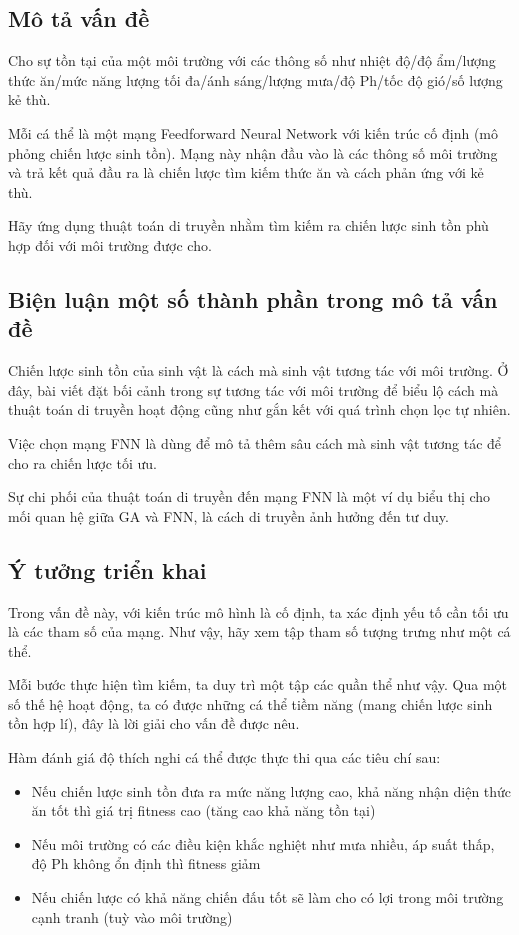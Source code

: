 \subsection{Mô tả vấn đề}
	Cho sự tồn tại của một môi trường với các thông số như nhiệt độ/độ ẩm/lượng thức ăn/mức năng lượng tối đa/ánh sáng/lượng mưa/độ Ph/tốc độ gió/số lượng kẻ thù.
	 
	Mỗi cá thể là một mạng Feedforward Neural Network với kiến trúc cố định (mô phỏng chiến lược sinh tồn). Mạng này nhận đầu vào là các thông số môi trường và trả kết quả đầu ra là chiến lược tìm kiếm thức ăn và cách phản ứng với kẻ thù.
	
	Hãy ứng dụng thuật toán di truyền nhằm tìm kiếm ra chiến lược sinh tồn phù hợp đối với môi trường được cho.

\subsection{Biện luận một số thành phần trong mô tả vấn đề}
	Chiến lược sinh tồn của sinh vật là cách mà sinh vật tương tác với môi trường. Ở đây, bài viết đặt bối cảnh trong sự tương tác với môi trường để biểu lộ cách mà thuật toán di truyền hoạt động cũng như gắn kết với quá trình chọn lọc tự nhiên.
	
	Việc chọn mạng FNN là dùng để mô tả thêm sâu cách mà sinh vật tương tác để cho ra chiến lược tối ưu.
	
	Sự chi phối của thuật toán di truyền đến mạng FNN là một ví dụ biểu thị cho mối quan hệ giữa GA và FNN, là cách di truyền ảnh hưởng đến tư duy.
	
\subsection{Ý tưởng triển khai}
	Trong vấn đề này, với kiến trúc mô hình là cố định, ta xác định yếu tố cần tối ưu là các tham số của mạng. Như vậy, hãy xem tập tham số tượng trưng như một cá thể. 
	
	Mỗi bước thực hiện tìm kiếm, ta duy trì một tập các quần thể như vậy. Qua một số thế hệ hoạt động, ta có được những cá thể tiềm năng (mang chiến lược sinh tồn hợp lí), đây là lời giải cho vấn đề được nêu.
	
	Hàm đánh giá độ thích nghi cá thể được thực thi qua các tiêu chí sau:
	\begin{itemize}
		\item Nếu chiến lược sinh tồn đưa ra mức năng lượng cao, khả năng nhận diện thức ăn tốt thì giá trị fitness cao (tăng cao khả năng tồn tại)
		\item Nếu môi trường có các điều kiện khắc nghiệt như mưa nhiều, áp suất thấp, độ Ph không ổn định thì fitness giảm
		\item Nếu chiến lược có khả năng chiến đấu tốt sẽ làm cho có lợi trong môi trường cạnh tranh (tuỳ vào môi trường)
	\end{itemize}
	

